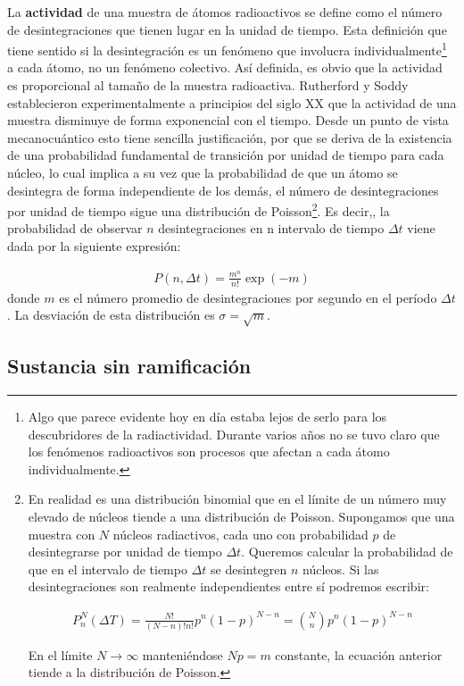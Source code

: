 La \textbf{actividad} de una muestra de átomos radioactivos se define como el número de desintegraciones que tienen lugar en la unidad de tiempo. Esta definición que tiene sentido si la desintegración es un fenómeno que involucra individualmente\footnote{Algo que parece evidente hoy en día estaba lejos de serlo para los descubridores de la radiactividad. Durante varios años no se tuvo claro que los fenómenos radioactivos son procesos que afectan a cada átomo individualmente.} a cada átomo, no un fenómeno colectivo. Así definida, es obvio que la actividad es proporcional al tamaño de la muestra radioactiva. Rutherford y Soddy establecieron experimentalmente a principios del siglo XX que la actividad de una muestra disminuye de forma exponencial con el tiempo. Desde un punto de vista mecanocuántico esto tiene sencilla justificación, por que se deriva de la existencia de una probabilidad fundamental de transición por unidad de tiempo para cada núcleo, lo cual implica a su vez que la probabilidad de que un átomo se desintegra de forma independiente de los demás, el número de desintegraciones por unidad de tiempo sigue una distribución de Poisson\footnote{En realidad es una distribución binomial que en el límite de un número muy elevado de núcleos tiende a una distribución de Poisson. Supongamos que una muestra con $N$ núcleos radiactivos, cada uno con probabilidad $p$ de desintegrarse por unidad de tiempo $\Delta t$. Queremos calcular la probabilidad de que en el intervalo de tiempo $\Delta t$ se desintegren $n$ núcleos. Si las desintegraciones son realmente independientes entre sí podremos escribir:

\begin{eqnarray}
	P_n^N (\Delta T) = \frac{N!}{(N-n)!n!} p^n (1-p)^{N-n} = \binom{N}{n} p^n (1-p)^{N-n}
\end{eqnarray}

En el límite $N\rightarrow \infty$ manteniéndose $Np=m$ constante, la ecuación anterior tiende a la distribución de Poisson.}. Es decir,, la probabilidad de observar $n$ desintegraciones en n intervalo de tiempo $\Delta t$ viene dada por la siguiente expresión:

\begin{eqnarray}
	P(n,\Delta t) = \frac{m^n}{n!} \exp (-m)
\end{eqnarray}
donde $m$ es el número promedio de desintegraciones por segundo en el período $\Delta t$. La desviación de esta distribución es $\sigma = \sqrt{m}$.


\subsection{Sustancia sin ramificación} \label{Subsec:02-04-01}

